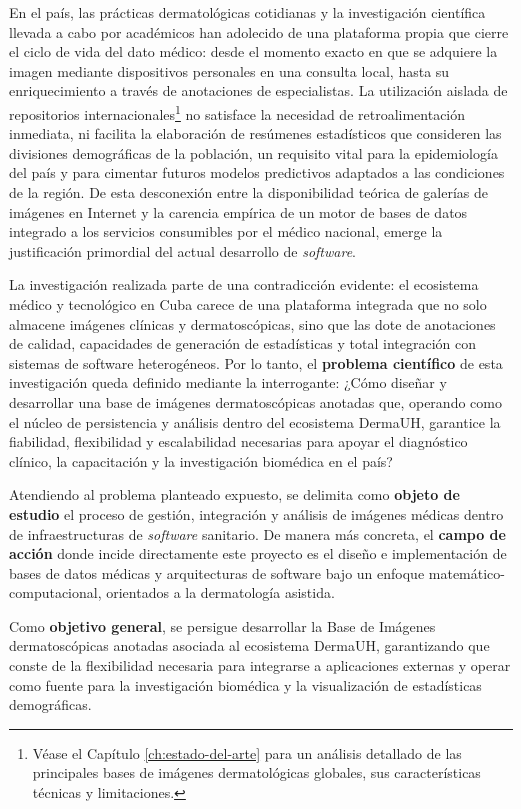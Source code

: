 En el país, las prácticas dermatológicas cotidianas y la investigación científica llevada a cabo por 
académicos han adolecido de una plataforma propia que cierre el ciclo de vida del dato médico: desde 
el momento exacto en que se adquiere la imagen mediante dispositivos personales en una consulta local, 
hasta su enriquecimiento a través de anotaciones de especialistas. La utilización aislada de repositorios 
internacionales\footnote{Véase el Capítulo \ref{ch:estado-del-arte} para un análisis detallado de las 
principales bases de imágenes dermatológicas globales, sus características técnicas y limitaciones.}
no satisface la necesidad de retroalimentación inmediata, ni facilita la elaboración de 
resúmenes estadísticos que consideren las divisiones demográficas de la población, un requisito vital 
para la epidemiología del país y para cimentar futuros modelos predictivos adaptados a las condiciones 
de la región. De esta desconexión entre la disponibilidad teórica de galerías de imágenes en Internet y 
la carencia empírica de un motor de bases de datos integrado a los servicios consumibles por el médico 
nacional, emerge la justificación primordial del actual desarrollo de \textit{software}.

La investigación realizada parte de una contradicción evidente: el ecosistema médico y tecnológico en Cuba carece de 
una plataforma integrada que no solo almacene imágenes clínicas y dermatoscópicas, sino que las dote de 
anotaciones de calidad, capacidades de generación de estadísticas y total integración con sistemas de 
software heterogéneos. Por lo tanto, el \textbf{problema científico} 
de esta investigación queda definido mediante la interrogante: ¿Cómo diseñar y desarrollar una base de 
imágenes dermatoscópicas anotadas que, operando como el núcleo de persistencia y análisis dentro del 
ecosistema DermaUH, garantice la fiabilidad, flexibilidad y escalabilidad necesarias para apoyar el 
diagnóstico clínico, la capacitación y la investigación biomédica en el país?


Atendiendo al problema planteado expuesto, se delimita como \textbf{objeto de estudio} el proceso de gestión, 
integración y análisis de imágenes médicas dentro de infraestructuras de \textit{software} sanitario. De manera más 
concreta, el \textbf{campo de acción} donde incide directamente este proyecto es el diseño e implementación 
de bases de datos médicas y arquitecturas de software bajo un enfoque matemático-computacional, orientados 
a la dermatología asistida.

Como \textbf{objetivo general}, se persigue desarrollar la Base de Imágenes dermatoscópicas anotadas asociada 
al ecosistema DermaUH, garantizando que conste de la flexibilidad necesaria para integrarse a aplicaciones 
externas y operar como fuente para la investigación biomédica y la visualización de estadísticas demográficas.

